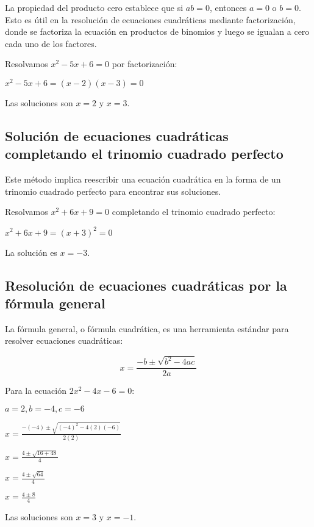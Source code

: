 La propiedad del producto cero establece que si \( ab = 0 \), entonces \( a = 0 \) o \( b = 0 \). Esto es útil en la resolución de ecuaciones cuadráticas mediante factorización, donde se factoriza la ecuación en productos de binomios y luego se igualan a cero cada uno de los factores.

\begin{example}
Resolvamos \( x^2 - 5x + 6 = 0 \) por factorización:

\( x^2 - 5x + 6 = (x - 2)(x - 3) = 0 \)

Las soluciones son \( x = 2 \) y \( x = 3 \).
\end{example}

\subsection{Solución de ecuaciones cuadráticas completando el trinomio cuadrado perfecto}

Este método implica reescribir una ecuación cuadrática en la forma de un trinomio cuadrado perfecto para encontrar sus soluciones.

\begin{example}
Resolvamos \( x^2 + 6x + 9 = 0 \) completando el trinomio cuadrado perfecto:

\( x^2 + 6x + 9 = (x + 3)^2 = 0 \)

La solución es \( x = -3 \).
\end{example}

\subsection{Resolución de ecuaciones cuadráticas por la fórmula general}

La fórmula general, o fórmula cuadrática, es una herramienta estándar para resolver ecuaciones cuadráticas:

\[
x = \frac{-b \pm \sqrt{b^2 - 4ac}}{2a}
\]

\begin{example}
Para la ecuación \( 2x^2 - 4x - 6 = 0 \):

\( a = 2, b = -4, c = -6 \)

\( x = \frac{-(-4) \pm \sqrt{(-4)^2 - 4(2)(-6)}}{2(2)} \)

\( x = \frac{4 \pm \sqrt{16 + 48}}{4} \)

\( x = \frac{4 \pm \sqrt{64}}{4} \)

\( x = \frac{4 \pm 8}{4} \)

Las soluciones son \( x = 3 \) y \( x = -1 \).
\end{example}

